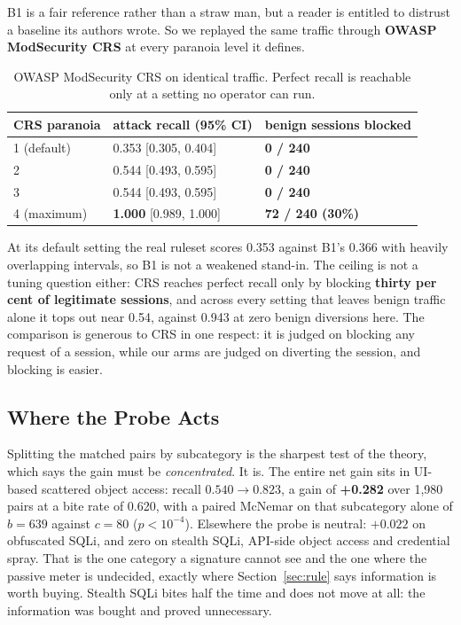 \documentclass[runningheads]{llncs}
\begin{document}
B1 is a fair reference rather than a straw man, but a reader is entitled to distrust
a baseline its authors wrote. So we replayed the same traffic through \textbf{OWASP
ModSecurity CRS} at every paranoia level it defines.

\begin{table}[t]
\centering
\caption{OWASP ModSecurity CRS on identical traffic. Perfect recall is reachable
only at a setting no operator can run.}
\label{tab:crs}
\begin{tabular}{lll}
\toprule
CRS paranoia & attack recall (95\% CI) & benign sessions blocked \\
\midrule
1 (default) & 0.353 [0.305, 0.404] & \textbf{0 / 240} \\
2           & 0.544 [0.493, 0.595] & \textbf{0 / 240} \\
3           & 0.544 [0.493, 0.595] & \textbf{0 / 240} \\
4 (maximum) & \textbf{1.000} [0.989, 1.000] & \textbf{72 / 240 (30\%)} \\
\bottomrule
\end{tabular}
\end{table}

At its default setting the real ruleset scores 0.353 against B1's 0.366 with heavily
overlapping intervals, so B1 is not a weakened stand-in. The ceiling is not a tuning
question either: CRS reaches perfect recall only by blocking \textbf{thirty per cent
of legitimate sessions}, and across every setting that leaves benign traffic alone it
tops out near 0.54, against 0.943 at zero benign diversions here. The comparison is
generous to CRS in one respect: it is judged on blocking any request of a session,
while our arms are judged on diverting the session, and blocking is easier.

\subsection{Where the Probe Acts}

Splitting the matched pairs by subcategory is the sharpest test of the theory, which
says the gain must be \emph{concentrated}. It is. The entire net gain sits in
UI-based scattered object access: recall $0.540 \rightarrow 0.823$, a gain of
\textbf{+0.282} over 1,980 pairs at a bite rate of 0.620, with a paired McNemar on
that subcategory alone of $b = 639$ against $c = 80$ ($p < 10^{-4}$). Elsewhere the
probe is neutral: $+0.022$ on obfuscated SQLi, and zero on stealth SQLi, API-side
object access and credential spray. That is the one category a signature cannot see
and the one where the passive meter is undecided, exactly where
Section~\ref{sec:rule} says information is worth buying. Stealth SQLi bites half the
time and does not move at all: the information was bought and proved unnecessary.
\end{document}

